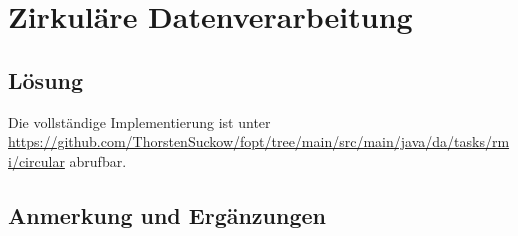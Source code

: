 \section{Zirkuläre Datenverarbeitung}\label{ch:circular}


\subsection{Lösung}

Die vollständige Implementierung ist unter \url{https://github.com/ThorstenSuckow/fopt/tree/main/src/main/java/da/tasks/rmi/circular} abrufbar.

\subsection{Anmerkung und Ergänzungen}


